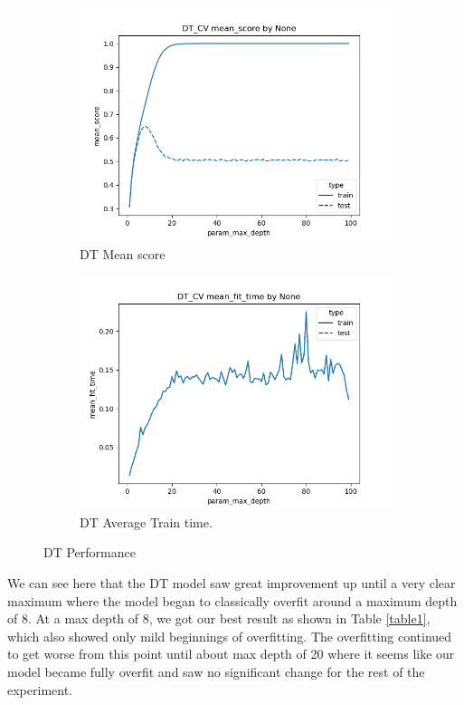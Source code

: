 \documentclass[12pt]{article}
\begin{document}
\begin{figure}
  \begin{subfigure}{.5\textwidth}
    \includegraphics[width=.95\textwidth]{../results/DT_cv/None_mean_score_param_max_depth.png}
    \caption{DT Mean score}
    \end{subfigure}%
  \begin{subfigure}{.5\textwidth}
    \includegraphics[width=.95\textwidth]{../results/DT_cv/None_mean_fit_time_param_max_depth.png}
    \caption{DT Average Train time.}
  \end{subfigure}
  \caption{DT Performance}
  \label{figure2}
\end{figure}

We can see here that the DT model saw great improvement up until a very clear maximum where the model began to classically 
overfit around a maximum depth of 8. At a max depth of 8, we got our best result as shown in Table \ref{table1}, which 
also showed only mild beginnings of overfitting. The overfitting continued to get worse from this point until about 
max depth of 20 where it seems like our model became fully overfit and saw no significant change for the rest of 
the experiment.
\end{document}
